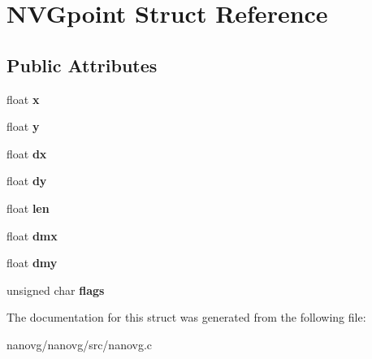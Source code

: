 \hypertarget{struct_n_v_gpoint}{\section{N\+V\+Gpoint Struct Reference}
\label{struct_n_v_gpoint}
}
\subsection*{Public Attributes}
\begin{DoxyCompactItemize}
\item 
\hypertarget{struct_n_v_gpoint_a326d40b39869030b6c45b5b882be9fbb}{float {\bfseries x}}\label{struct_n_v_gpoint_a326d40b39869030b6c45b5b882be9fbb}

\item 
\hypertarget{struct_n_v_gpoint_a40a1ffbc5c699987afffd14a8bb4741b}{float {\bfseries y}}\label{struct_n_v_gpoint_a40a1ffbc5c699987afffd14a8bb4741b}

\item 
\hypertarget{struct_n_v_gpoint_a05a14d0cf2609a3aad0090d1eb90b1f2}{float {\bfseries dx}}\label{struct_n_v_gpoint_a05a14d0cf2609a3aad0090d1eb90b1f2}

\item 
\hypertarget{struct_n_v_gpoint_a3b77b6c1575026fd69f764bf30207a3a}{float {\bfseries dy}}\label{struct_n_v_gpoint_a3b77b6c1575026fd69f764bf30207a3a}

\item 
\hypertarget{struct_n_v_gpoint_a6224808e39e30ade508d7abb819a2600}{float {\bfseries len}}\label{struct_n_v_gpoint_a6224808e39e30ade508d7abb819a2600}

\item 
\hypertarget{struct_n_v_gpoint_afc6439309cd324716d46c9531cd6a9fb}{float {\bfseries dmx}}\label{struct_n_v_gpoint_afc6439309cd324716d46c9531cd6a9fb}

\item 
\hypertarget{struct_n_v_gpoint_aed3b812230172a44e00d8f305b2fc3bc}{float {\bfseries dmy}}\label{struct_n_v_gpoint_aed3b812230172a44e00d8f305b2fc3bc}

\item 
\hypertarget{struct_n_v_gpoint_a0df9b61eba4d68d5ec44ccbfe78b7bf0}{unsigned char {\bfseries flags}}\label{struct_n_v_gpoint_a0df9b61eba4d68d5ec44ccbfe78b7bf0}

\end{DoxyCompactItemize}


The documentation for this struct was generated from the following file\+:\begin{DoxyCompactItemize}
\item 
nanovg/nanovg/src/nanovg.\+c\end{DoxyCompactItemize}
